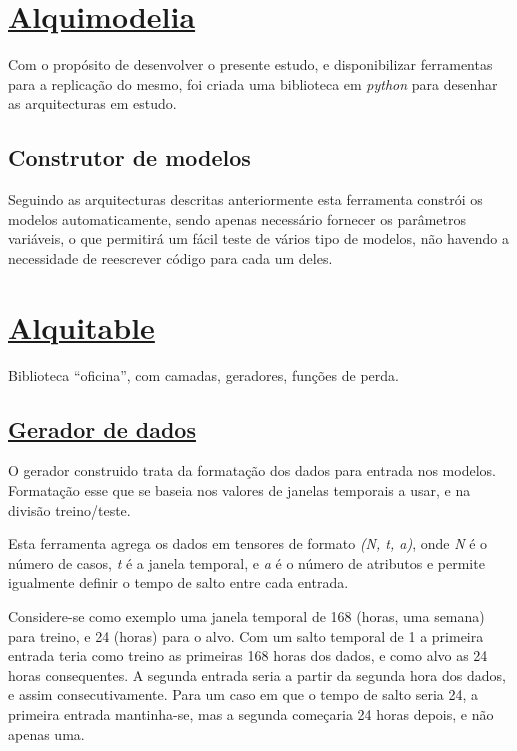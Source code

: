 \section{\href{https://github.com/alquimodelia/alquimodelia}{Alquimodelia}\label{se:alquimodelia}}


Com o propósito de desenvolver o presente estudo, e disponibilizar ferramentas para a replicação do mesmo, foi criada uma biblioteca em \textit{python} para desenhar as arquitecturas em estudo.\par

\subsection{Construtor de modelos}

Seguindo as arquitecturas descritas anteriormente esta ferramenta constrói os modelos automaticamente, sendo apenas necessário fornecer os parâmetros variáveis, o que permitirá um fácil teste de vários tipo de modelos, não havendo a necessidade de reescrever código para cada um deles.\par

\section{\href{https://github.com/alquimodelia/alquitable/blob/main/alquitable}{Alquitable}}

Biblioteca “oficina”, com camadas, geradores, funções de perda.

\subsection{\href{https://github.com/alquimodelia/alquitable/blob/main/alquitable/generator.py}{Gerador de dados}}

O gerador construido trata da formatação dos dados para entrada nos modelos. Formatação esse que se baseia nos valores de janelas temporais a usar, e na divisão treino/teste.\par
Esta ferramenta agrega os dados em tensores de formato \textit{(N, t, a)}, onde \textit{N} é o número de casos, \textit{t} é a janela temporal, e \textit{a} é o número de atributos e permite igualmente definir o tempo de salto entre cada entrada.\par
Considere-se como exemplo uma janela temporal de 168 (horas, uma semana) para treino, e 24 (horas) para o alvo. Com um salto temporal de 1 a primeira entrada teria como treino as primeiras 168 horas dos dados, e como alvo as 24 horas consequentes. A segunda entrada seria a partir da segunda hora dos dados, e assim consecutivamente. Para um caso em que o tempo de salto seria 24, a primeira entrada mantinha-se, mas a segunda começaria 24 horas depois, e não apenas uma.\par

